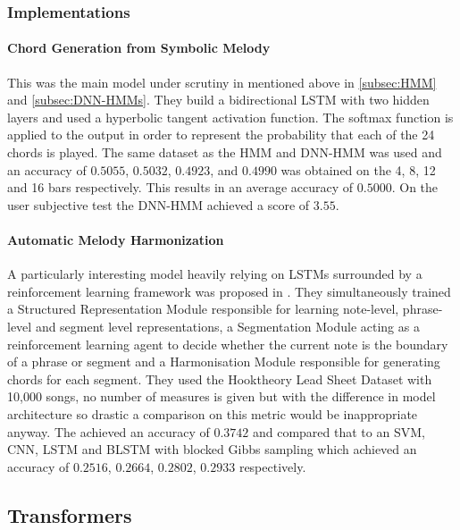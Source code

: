\subsubsection{Implementations}

\paragraph{Chord Generation from Symbolic Melody} This was the main model under scrutiny in \cite{BLSTM} mentioned above in \autoref{subsec:HMM} and \autoref{subsec:DNN-HMMs}.
They build a bidirectional LSTM with two hidden layers and used a hyperbolic tangent activation function. The softmax function is applied to the output in order to represent the probability that each of the 24 chords is played.
The same dataset as the HMM and DNN-HMM was used and an accuracy of $0.5055$, $0.5032$, $0.4923$, and $0.4990$  was obtained on the 4, 8, 12 and 16 bars respectively. This results in an average accuracy of $0.5000$.
On the user subjective test the DNN-HMM achieved a score of $3.55$.

\paragraph{Automatic Melody Harmonization} A particularly interesting model heavily relying on LSTMs surrounded by a reinforcement learning framework was proposed in \cite{ReinforcementLearning}.
They simultaneously trained a Structured Representation Module responsible for learning note-level, phrase-level and segment level representations, a Segmentation Module acting as a reinforcement learning agent to decide whether the current note is the boundary of a phrase or segment and a Harmonisation Module responsible for generating chords for each segment.
They used the Hooktheory Lead Sheet Dataset with 10,000 songs, no number of measures is given but with the difference in model architecture so drastic a comparison on this metric would be inappropriate anyway.
The achieved an accuracy of $0.3742$ and compared that to an SVM, CNN, LSTM and BLSTM with blocked Gibbs sampling which achieved an accuracy of $0.2516$, $0.2664$, $0.2802$, $0.2933$ respectively.

\subsection{Transformers}
\label{Transformers Ed}
